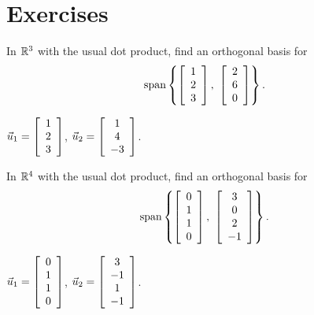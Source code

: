 \documentclass{ximera}
\author{Zack Reed}
\begin{document}
\section*{Exercises}

\begin{exercise}\label{ex:orthogonal-basis-r3}
  In $\R^3$ with the usual dot product, find an orthogonal basis for
  \begin{equation*}
    \sspan\set{
      \startmat{c} 1 \\ 2 \\ 3 \stopmat,~
      \startmat{c} 2 \\ 6 \\ 0 \stopmat
    }.
  \end{equation*}
  \begin{solution}
    $\vect{u}_1 = \startmat{c} 1 \\ 2 \\ 3 \stopmat$,
    $\vect{u}_2 = \startmat{c} 1 \\ 4 \\ -3 \stopmat$.
  \end{solution}
\end{exercise}

\begin{exercise}
  In $\R^4$ with the usual dot product, find an orthogonal basis for
  \begin{equation*}
    \sspan\set{
      \startmat{c} 0 \\ 1 \\ 1 \\  0 \stopmat,~
      \startmat{c} 3 \\ 0 \\ 2 \\ -1 \stopmat
    }.
  \end{equation*}
  \begin{solution}
    $\vect{u}_1 = \startmat{c} 0 \\ 1 \\ 1 \\ 0 \stopmat$,
    $\vect{u}_2 = \startmat{c} 3 \\ -1 \\ 1 \\ -1 \stopmat$.
  \end{solution}
\end{exercise}
\end{document}
